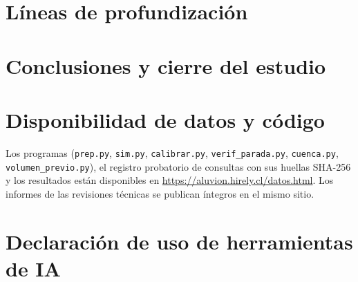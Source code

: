 \documentclass[10pt,a4paper]{article}
\begin{document}
\section{Líneas de profundización}\label{sec:profundizacion}


\section{Conclusiones y cierre del estudio}\label{sec:conclusiones}


\section*{Disponibilidad de datos y código}
Los programas (\texttt{prep.py}, \texttt{sim.py}, \texttt{calibrar.py}, \texttt{verif\_parada.py}, \texttt{cuenca.py}, \texttt{volumen\_previo.py}), el registro probatorio de consultas con sus huellas SHA-256 y los resultados están disponibles en \url{https://aluvion.hirely.cl/datos.html}. Los informes de las revisiones técnicas se publican íntegros en el mismo sitio.

\section*{Declaración de uso de herramientas de IA}\label{sec:declaracion-ia}




\clearpage\appendix

\end{document}
